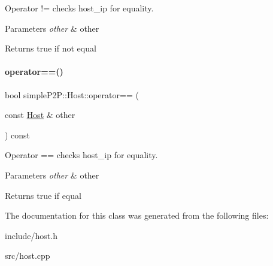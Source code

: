 Operator != checks host\+\_\+ip for equality. 


\begin{DoxyParams}{Parameters}
{\em other} & other \\
\hline
\end{DoxyParams}
\begin{DoxyReturn}{Returns}
true if not equal 
\end{DoxyReturn}
\mbox{\label{classsimpleP2P_1_1Host_aadac09c6ab516f62e5eebe28dd584626}} 
\paragraph{\texorpdfstring{operator==()}{operator==()}}
{\footnotesize\ttfamily bool simple\+P2\+P\+::\+Host\+::operator== (\begin{DoxyParamCaption}\item[{const \hyperlink{classsimpleP2P_1_1Host}{Host} \&}]{other }\end{DoxyParamCaption}) const}



Operator == checks host\+\_\+ip for equality. 


\begin{DoxyParams}{Parameters}
{\em other} & other \\
\hline
\end{DoxyParams}
\begin{DoxyReturn}{Returns}
true if equal 
\end{DoxyReturn}


The documentation for this class was generated from the following files\+:\begin{DoxyCompactItemize}
\item 
include/host.\+h\item 
src/host.\+cpp\end{DoxyCompactItemize}
